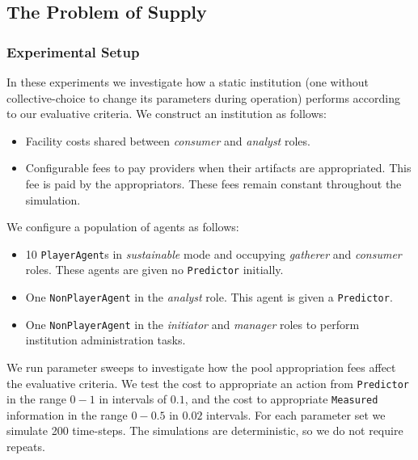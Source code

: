 
\subsection{The Problem of Supply}\label{sec:supply}

\subsubsection*{Experimental Setup}

In these experiments we investigate how a static institution (one without
coll\-ective-choice to change its parameters during operation) performs
according to our evaluative criteria. We construct an institution as follows:

\begin{itemize}
\item Facility costs shared between \emph{consumer} and \emph{analyst} roles.
\item Configurable fees to pay providers when their artifacts are appropriated. This fee is paid by the appropriators. These fees remain constant throughout the simulation.
\end{itemize}

We configure a population of agents as follows:

\begin{itemize}
\item 10 \texttt{PlayerAgent}s in \emph{sustainable} mode and occupying \emph{gatherer} and \emph{consumer} roles. These agents are given no \texttt{Predictor} initially.
\item One \texttt{NonPlayerAgent} in the \emph{analyst} role. This agent is given a \texttt{Predictor}.
\item One \texttt{NonPlayerAgent} in the \emph{initiator} and \emph{manager} roles to perform institution administration tasks.
\end{itemize}

We run parameter sweeps to investigate how the pool appropriation fees
affect the evaluative criteria. We test the cost to appropriate an action from
\texttt{Predictor} in the range $0-1$ in intervals of $0.1$, and the cost to
appropriate \texttt{Measured} information in the range $0-0.5$ in $0.02$
intervals. For each parameter set we simulate 200 time-steps. The simulations
are deterministic, so we do not require repeats.

